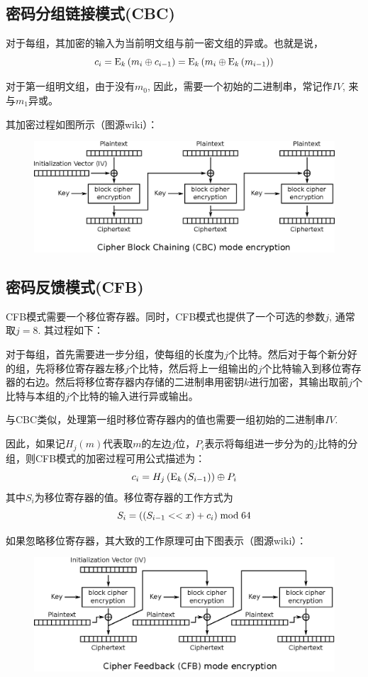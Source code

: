\subsection{密码分组链接模式(CBC)}
对于每组，其加密的输入为当前明文组与前一密文组的异或。也就是说，
\begin{equation}
c_i={\mathrm{E}_{k}\left({m_i\oplus c_{i-1}}\right)}={\mathrm{E}_{k}\left({m_i\oplus {\mathrm{E}_{k}\left({m_{i-1}}\right)}}\right)}
\end{equation}

对于第一组明文组，由于没有$m_0$, 因此，需要一个初始的二进制串，常记作$IV$, 来与$m_1$异或。\par
其加密过程如图所示（图源wiki）：
\begin{figure}[H]
\centering
\includegraphics[scale=1]{chapters/chapter_3/CBC.eps}
\end{figure}
\subsection{密码反馈模式(CFB)}
CFB模式需要一个移位寄存器。同时，CFB模式也提供了一个可选的参数$j$, 通常取$j=8$. 其过程如下：\par
对于每组，首先需要进一步分组，使每组的长度为$j$个比特。然后对于每个新分好的组，先将移位寄存器左移$j$个比特，然后将上一组输出的$j$个比特输入到移位寄存器的右边。然后将移位寄存器内存储的二进制串用密钥$k$进行加密，其输出取前$j$个比特与本组的$j$个比特的输入进行异或输出。\par
与CBC类似，处理第一组时移位寄存器内的值也需要一组初始的二进制串$IV$.\par
因此，如果记$H_j(m)$代表取$m$的左边$j$位，$P_i$表示将每组进一步分为的$j$比特的分组，则CFB模式的加密过程可用公式描述为：
\begin{equation}
c_i=H_j\left( {{\mathrm{E}_{k}\left({S_{i-1}}\right)}}\right)\oplus P_i
\end{equation}
其中$S_i$为移位寄存器的值。移位寄存器的工作方式为
\begin{equation}
S_i=\left( {\left( {S_{i-1} << x}\right)+c_i}\right)\bmod{64}
\end{equation}

如果忽略移位寄存器，其大致的工作原理可由下图表示（图源wiki）：
\begin{figure}[H]
\centering
\includegraphics[scale=1]{chapters/chapter_3/CFB.eps}
\end{figure}
